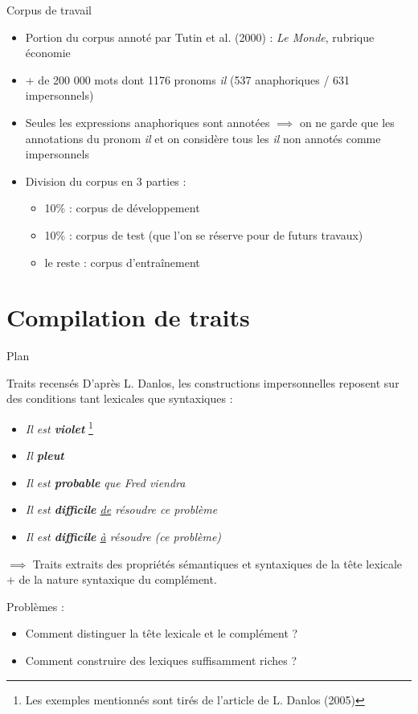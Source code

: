 \documentclass{beamer}
\begin{document}
\begin{frame}{Corpus de travail}
\begin{itemize}
  \item Portion du corpus annoté par Tutin et al. (2000) : \textit{Le Monde}, rubrique économie
  \item + de 200 000 mots dont 1176 pronoms \og \textit{il} \fg{} (537 anaphoriques / 631 impersonnels)
  \item Seules les expressions anaphoriques sont annotées $\implies$ on ne garde que les annotations du pronom \og \textit{il} \fg{} et on considère tous les \og \textit{il} \fg{} non annotés comme impersonnels
  \item Division du corpus en 3 parties :
  \begin{itemize}
    \item 10\% : corpus de développement
    \item 10\% : corpus de test (que l'on se réserve pour de futurs travaux)
    \item le reste : corpus d'entraînement
  \end{itemize}
\end{itemize}
\end{frame}


\section{Compilation de traits}

\begin{frame}{Plan}
  \tableofcontents[currentsection]
\end{frame}

\begin{frame}{Traits recensés}
D'après L. Danlos, les constructions impersonnelles reposent sur des conditions tant lexicales que syntaxiques :
\begin{itemize}
  \item \og \textit{Il est \textbf{violet}} \fg{}\footnote{Les exemples mentionnés sont tirés de l'article de L. Danlos (2005)}
  \item \og \textit{Il \textbf{pleut}} \fg{}  
  \item \og \textit{Il est \textbf{probable} que Fred viendra} \fg{} 
  \item \og \textit{Il est \textbf{difficile} \underline{de} résoudre ce problème} \fg{}
   \item \og \textit{Il est \textbf{difficile} \underline{à} résoudre (ce problème)} \fg{} 
\end{itemize}
\vskip 0.2cm
$\implies$ Traits extraits des propriétés sémantiques et syntaxiques de la tête lexicale + de la nature syntaxique du complément.
\begin{alertblock}{Problèmes :}
\begin{itemize}
  \item Comment distinguer la tête lexicale et le complément ?
  \item Comment construire des lexiques suffisamment riches ?
\end{itemize}
\end{alertblock}
\end{frame}
\end{document}
